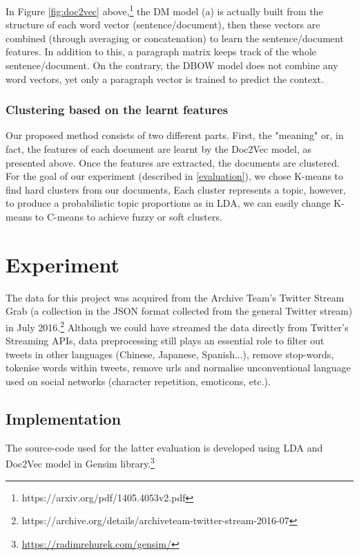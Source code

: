 \documentclass[11pt]{article}
\begin{document}
In Figure \ref{fig:doc2vec} above,\footnote{https://arxiv.org/pdf/1405.4053v2.pdf} the DM model (a) is actually built from the structure of each word vector (sentence/document), then these vectors are combined (through averaging or concatenation) to learn the sentence/document features. In addition to this, a paragraph matrix keeps track of the whole sentence/document. On the contrary, the DBOW model does not combine any word vectors, yet only a paragraph vector is trained to predict the context.

\subsubsection{Clustering based on the learnt features}
Our proposed method consists of two different parts. First, the "meaning" or, in fact, the features of each document are learnt by the Doc2Vec model, as presented above. Once the features are extracted, the documents are clustered. For the goal of our experiment (described in \ref{evaluation}), we chose K-means to find hard clusters from our documents, Each cluster represents a topic, however, to produce a probabilistic topic proportions as in LDA, we can easily change K-means to C-means to achieve fuzzy or soft clusters.


\section{Experiment} \label{experiment}

The data for this project was acquired from the Archive Team's Twitter Stream Grab (a collection in the JSON format collected from the general Twitter stream) in July 2016.\footnote{https://archive.org/details/archiveteam-twitter-stream-2016-07} Although we could have streamed the data directly from Twitter's Streaming APIs, data preprocessing still plays an essential role to filter out tweets in other languages (Chinese, Japanese, Spanish...), remove stop-words, tokenise words within tweets, remove urls and normalise unconventional language used on social networks (character repetition, emoticons, etc.).

\subsection{Implementation}
The source-code used for the latter evaluation is developed using LDA and Doc2Vec model in Gensim library.\footnote{\url{https://radimrehurek.com/gensim/}}
\end{document}

